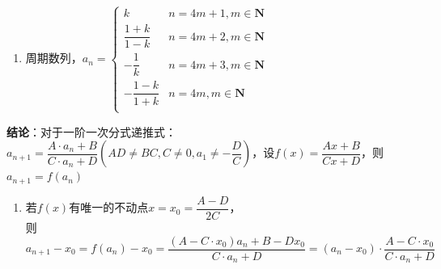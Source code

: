 \begin{enumerate}
\begin{jieda}
\begin{enumerate}
            \item 周期数列，$a_n = \left\{\begin{array}{ll}
                k & n = 4m+1, m \in \mathbf{N} \\
                \dfrac{1+k}{1-k} & n = 4m+2, m \in \mathbf{N} \\
                -\dfrac{1}{k} & n = 4m+3, m \in \mathbf{N} \\
                -\dfrac{1-k}{1+k} & n = 4m, m \in \mathbf{N} \\
            \end{array}\right.$
        \end{enumerate}
        

        \textbf{结论}：对于一阶一次分式递推式：$a_{n+1} = \dfrac{A \cdot a_n+B}{C \cdot a_n+D} \left(AD \neq BC, C \neq 0, a_1 \neq -\dfrac{D}{C}\right)$，设$f(x) = \dfrac{Ax+B}{Cx+D}$，则$a_{n+1} = f(a_n)$
        \begin{enumerate}
            \item 若$f(x)$有唯一的不动点$x = x_0 = \dfrac{A-D}{2C}$，\\
            则$a_{n+1} - x_0 = f(a_n) - x_0 = \dfrac{(A-C \cdot x_0)a_n + B - Dx_0}{C\cdot a_n + D} = (a_n - x_0) \cdot \dfrac{A-C \cdot x_0}{C\cdot a_n + D}$



\end{enumerate}
\end{jieda}
\end{enumerate}
